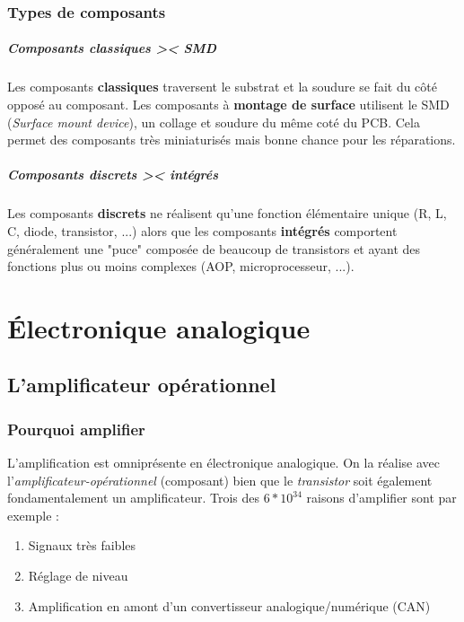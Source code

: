 \documentclass	[11pt, a4paper, openany]{book}
\begin{document}
\section{Types de composants}
\subsubsection{Composants classiques >< SMD}
Les composants \textbf{classiques} traversent le substrat et la soudure se fait du côté opposé au composant. Les composants à \textbf{montage de surface} utilisent le SMD (\textit{Surface mount device}), un collage et soudure du même coté du PCB. Cela permet des composants très miniaturisés mais bonne chance pour les réparations.


\subsubsection{Composants discrets >< intégrés}
Les composants \textbf{discrets} ne réalisent qu'une fonction élémentaire unique (R, L, C, diode, transistor, ...) alors que les composants \textbf{intégrés} comportent généralement une "puce" composée de beaucoup de transistors et ayant des fonctions plus ou moins complexes (AOP, microprocesseur, ...).




\part{Électronique analogique}
\setcounter{chapter}{3}
\chapter{L'amplificateur opérationnel}
\setcounter{section}{-1}
\section{Pourquoi amplifier}
L'amplification est omniprésente en électronique analogique. On la réalise avec l'\textit{amplificateur-opérationnel} (composant) bien que le \textit{transistor} soit également fondamentalement un amplificateur. Trois des $6*10^{34}$ raisons d'amplifier sont par exemple : 
\begin{enumerate}
\item Signaux très faibles
\item Réglage de niveau
\item Amplification en amont d'un convertisseur analogique/numérique (CAN)
\end{enumerate}
\end{document}
